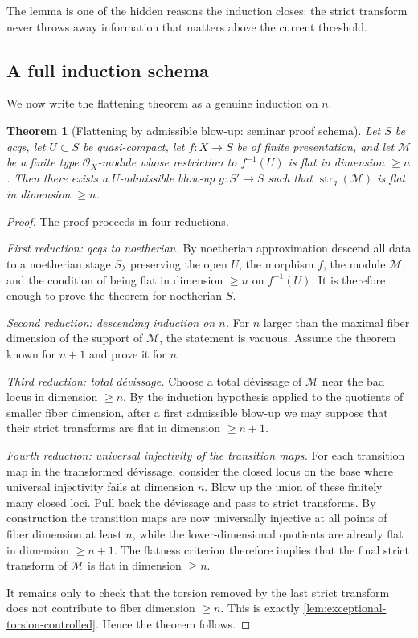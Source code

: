 \documentclass[11pt,oneside]{article}
\newtheorem{theorem}{Theorem}[section]
\newcommand{\M}{\mathcal M}
\newcommand{\OO}{\mathcal O}
\newcommand{\st}{\operatorname{str}}
\begin{document}
The lemma is one of the hidden reasons the induction closes: the strict transform never throws away information that matters above the current threshold.

\subsection{A full induction schema}

We now write the flattening theorem as a genuine induction on $n$.

\begin{theorem}[Flattening by admissible blow-up: seminar proof schema]\label{thm:flattening-schema-long}
Let $S$ be qcqs, let $U\subset S$ be quasi-compact, let $f\colon X\to S$ be of finite presentation, and let $\M$ be a finite type $\OO_X$-module whose restriction to $f^{-1}(U)$ is flat in dimension $\ge n$.  Then there exists a $U$-admissible blow-up $g\colon S'\to S$ such that $\st_g(\M)$ is flat in dimension $\ge n$.
\end{theorem}

\begin{proof}
The proof proceeds in four reductions.

\emph{First reduction: qcqs to noetherian.}  By noetherian approximation descend all data to a noetherian stage $S_\lambda$ preserving the open $U$, the morphism $f$, the module $\M$, and the condition of being flat in dimension $\ge n$ on $f^{-1}(U)$.  It is therefore enough to prove the theorem for noetherian $S$.

\emph{Second reduction: descending induction on $n$.}  For $n$ larger than the maximal fiber dimension of the support of $\M$, the statement is vacuous.  Assume the theorem known for $n+1$ and prove it for $n$.

\emph{Third reduction: total d\'evissage.}  Choose a total d\'evissage of $\M$ near the bad locus in dimension $\ge n$.  By the induction hypothesis applied to the quotients of smaller fiber dimension, after a first admissible blow-up we may suppose that their strict transforms are flat in dimension $\ge n+1$.

\emph{Fourth reduction: universal injectivity of the transition maps.}  For each transition map in the transformed d\'evissage, consider the closed locus on the base where universal injectivity fails at dimension $n$.  Blow up the union of these finitely many closed loci.  Pull back the d\'evissage and pass to strict transforms.  By construction the transition maps are now universally injective at all points of fiber dimension at least $n$, while the lower-dimensional quotients are already flat in dimension $\ge n+1$.  The flatness criterion therefore implies that the final strict transform of $\M$ is flat in dimension $\ge n$.

It remains only to check that the torsion removed by the last strict transform does not contribute to fiber dimension $\ge n$.  This is exactly \cref{lem:exceptional-torsion-controlled}.  Hence the theorem follows.
\end{proof}
\end{document}
